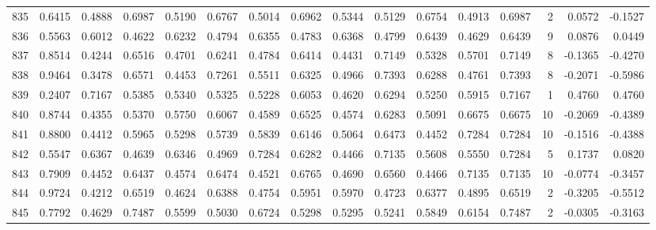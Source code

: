 \begin{tabular}{lrrrrrrrrrrrrrrr}
835 &      0.6415 &  0.4888 &  0.6987 &  0.5190 &  0.6767 &  0.5014 &  0.6962 &  0.5344 &  0.5129 &  0.6754 &   0.4913 &     0.6987 &      2 &                    0.0572 &                    -0.1527 \\
836 &      0.5563 &  0.6012 &  0.4622 &  0.6232 &  0.4794 &  0.6355 &  0.4783 &  0.6368 &  0.4799 &  0.6439 &   0.4629 &     0.6439 &      9 &                    0.0876 &                     0.0449 \\
837 &      0.8514 &  0.4244 &  0.6516 &  0.4701 &  0.6241 &  0.4784 &  0.6414 &  0.4431 &  0.7149 &  0.5328 &   0.5701 &     0.7149 &      8 &                   -0.1365 &                    -0.4270 \\
838 &      0.9464 &  0.3478 &  0.6571 &  0.4453 &  0.7261 &  0.5511 &  0.6325 &  0.4966 &  0.7393 &  0.6288 &   0.4761 &     0.7393 &      8 &                   -0.2071 &                    -0.5986 \\
839 &      0.2407 &  0.7167 &  0.5385 &  0.5340 &  0.5325 &  0.5228 &  0.6053 &  0.4620 &  0.6294 &  0.5250 &   0.5915 &     0.7167 &      1 &                    0.4760 &                     0.4760 \\
840 &      0.8744 &  0.4355 &  0.5370 &  0.5750 &  0.6067 &  0.4589 &  0.6525 &  0.4574 &  0.6283 &  0.5091 &   0.6675 &     0.6675 &     10 &                   -0.2069 &                    -0.4389 \\
841 &      0.8800 &  0.4412 &  0.5965 &  0.5298 &  0.5739 &  0.5839 &  0.6146 &  0.5064 &  0.6473 &  0.4452 &   0.7284 &     0.7284 &     10 &                   -0.1516 &                    -0.4388 \\
842 &      0.5547 &  0.6367 &  0.4639 &  0.6346 &  0.4969 &  0.7284 &  0.6282 &  0.4466 &  0.7135 &  0.5608 &   0.5550 &     0.7284 &      5 &                    0.1737 &                     0.0820 \\
843 &      0.7909 &  0.4452 &  0.6437 &  0.4574 &  0.6474 &  0.4521 &  0.6765 &  0.4690 &  0.6560 &  0.4466 &   0.7135 &     0.7135 &     10 &                   -0.0774 &                    -0.3457 \\
844 &      0.9724 &  0.4212 &  0.6519 &  0.4624 &  0.6388 &  0.4754 &  0.5951 &  0.5970 &  0.4723 &  0.6377 &   0.4895 &     0.6519 &      2 &                   -0.3205 &                    -0.5512 \\
845 &      0.7792 &  0.4629 &  0.7487 &  0.5599 &  0.5030 &  0.6724 &  0.5298 &  0.5295 &  0.5241 &  0.5849 &   0.6154 &     0.7487 &      2 &                   -0.0305 &                    -0.3163 \\

\end{tabular}
